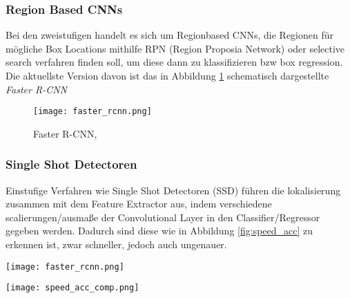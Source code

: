 \subsubsection{Region Based CNNs}
Bei den zweistufigen
handelt es sich um Regionbased CNNs, die Regionen für
mögliche Box Locations mithilfe RPN (Region Proposia Network)
oder selective search verfahren finden soll, um diese dann
zu klassifizieren bzw box regression. Die aktuellste Version 
davon ist das in Abbildung \ref{fig:faster_rcnn} schematisch 
dargestellte \textit{Faster R-CNN} \cite{renFasterRCNNRealTime2016a}


\begin{figure}[H]
    \centering
    \label{fig:faster_rcnn}
    \texttt{[image: faster\_rcnn.png]}
    \caption{Faster R-CNN, \cite{renFasterRCNNRealTime2016a}}
\end{figure}


\subsubsection{Single Shot Detectoren}
Einstufige Verfahren wie Single Shot Detectoren (SSD) 
führen die lokalisierung zusammen mit dem Feature Extractor 
aus, indem verschiedene scalierungen/ausmaße der Convolutional 
Layer in den Classifier/Regressor gegeben werden.
Dadurch sind diese wie in Abbildung \ref{fig:speed_acc}
zu erkennen ist, zwar schneller, jedoch auch ungenauer.


\begin{minipage}[t]{0.5\textwidth}
    \centering
    \label{fig:faster_rcnn}
    \texttt{[image: faster\_rcnn.png]}
\end{minipage}
\begin{minipage}[t]{0.5\textwidth}
    \centering
    \label{fig:speed_acc}
    \texttt{[image: speed\_acc\_comp.png]}
\end{minipage}